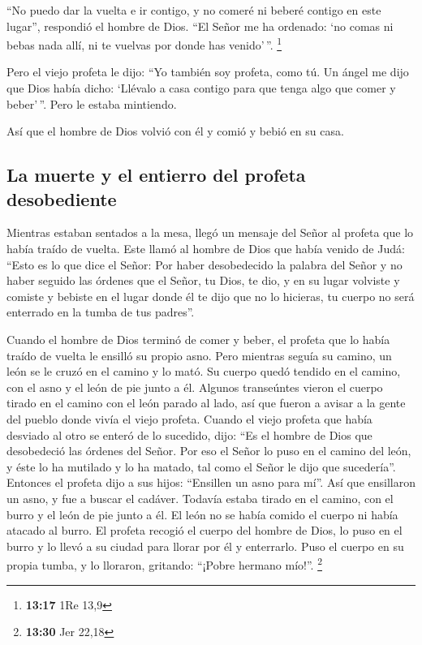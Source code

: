  ``No puedo dar la vuelta e ir contigo, y no comeré ni
beberé contigo en este lugar'', respondió el hombre de Dios.
 ``El Señor me ha ordenado: `no comas ni bebas nada allí,
ni te vuelvas por donde has venido'\,''. \footnote{\textbf{13:17} 1Re
  13,9}

 Pero el viejo profeta le dijo: ``Yo también soy profeta,
como tú. Un ángel me dijo que Dios había dicho: `Llévalo a casa contigo
para que tenga algo que comer y beber'\,''. Pero le estaba mintiendo.

 Así que el hombre de Dios volvió con él y comió y bebió
en su casa.

\hypertarget{la-muerte-y-el-entierro-del-profeta-desobediente}{%
\subsection{La muerte y el entierro del profeta
desobediente}\label{la-muerte-y-el-entierro-del-profeta-desobediente}}

 Mientras estaban sentados a la mesa, llegó un mensaje
del Señor al profeta que lo había traído de vuelta.  Este
llamó al hombre de Dios que había venido de Judá: ``Esto es lo que dice
el Señor: Por haber desobedecido la palabra del Señor y no haber seguido
las órdenes que el Señor, tu Dios, te dio,  y en su lugar
volviste y comiste y bebiste en el lugar donde él te dijo que no lo
hicieras, tu cuerpo no será enterrado en la tumba de tus padres''.

 Cuando el hombre de Dios terminó de comer y beber, el
profeta que lo había traído de vuelta le ensilló su propio asno.
 Pero mientras seguía su camino, un león se le cruzó en
el camino y lo mató. Su cuerpo quedó tendido en el camino, con el asno y
el león de pie junto a él.  Algunos transeúntes vieron el
cuerpo tirado en el camino con el león parado al lado, así que fueron a
avisar a la gente del pueblo donde vivía el viejo profeta.
 Cuando el viejo profeta que había desviado al otro se
enteró de lo sucedido, dijo: ``Es el hombre de Dios que desobedeció las
órdenes del Señor. Por eso el Señor lo puso en el camino del león, y
éste lo ha mutilado y lo ha matado, tal como el Señor le dijo que
sucedería''.  Entonces el profeta dijo a sus hijos:
``Ensillen un asno para mí''. Así que ensillaron un asno,
 y fue a buscar el cadáver. Todavía estaba tirado en el
camino, con el burro y el león de pie junto a él. El león no se había
comido el cuerpo ni había atacado al burro.  El profeta
recogió el cuerpo del hombre de Dios, lo puso en el burro y lo llevó a
su ciudad para llorar por él y enterrarlo.  Puso el
cuerpo en su propia tumba, y lo lloraron, gritando: ``¡Pobre hermano
mío!''. \footnote{\textbf{13:30} Jer 22,18}

